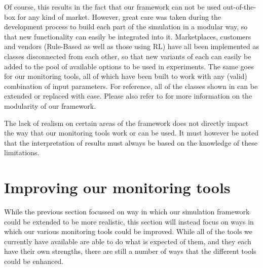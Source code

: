Of course, this results in the fact that our framework can not be used out-of-the-box for any kind of market. However, great care was taken during the development process to build each part of the simulation in a modular way, so that new functionality can easily be integrated into it. Marketplaces, customers and vendors (Rule-Based as well as those using RL) have all been implemented as classes disconnected from each other, so that new variants of each can easily be added to the pool of available options to be used in experiments. The same goes for our monitoring tools, all of which have been built to work with any (valid) combination of input parameters. For reference, all of the classes shown in  can be extended or replaced with ease. Please also refer to \cite{LeoThesis} for more information on the modularity of our framework.

The lack of realism on certain areas of the framework does not directly impact the way that our monitoring tools work or can be used. It must however be noted that the interpretation of results must always be based on the knowledge of these limitations.

\section{Improving our monitoring tools}

While the previous section focussed on way in which our simulation framework could be extended to be more realistic, this section will instead focus on ways in which our various monitoring tools could be improved. While all of the tools we currently have available are able to do what is expected of them, and they each have their own strengths, there are still a number of ways that the different tools could be enhanced.


